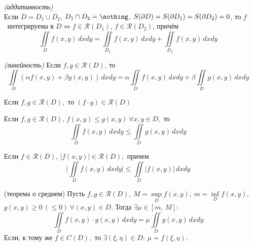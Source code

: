 \documentclass[a4paper,10pt]{article}
\begin{document}
	\begin{props*}
		\item \textit{(аддитивность)}\\
		Если $\overline{D} = \overline{D_1} \cup \overline{D_2}$, $D_1 \cap D_2 = \nothing$, $S(\partial D) = S(\partial D_1) = S(\partial D_2) = 0$, то $f$~интегрируема в $D \Leftrightarrow f \in \mathcal{R}(D_1)$, $f \in \mathcal{R}(D_2)$, причём $$\iint\limits_D f(x, y) \, dxdy = \iint\limits_{D_1} f(x, y) \, dxdy + \iint\limits_{D_2} f(x, y) \, dxdy$$
		\item \textit{(линейность)} Если $f, g \in\mathcal{R}(D)$, то\\
		$$\iint\limits_D(\alpha f(x,y)+\beta g(x,y))\,dxdy = \alpha\iint\limits_D f(x,y)\,dxdy + \beta\iint\limits_D g(x,y)\,dxdy$$
		\item Если $f,g\in \mathcal{R}(D),$ то $(f\cdot g)\in \mathcal{R}(D)$
		\item Если $f,g\in \mathcal{R}(D),\, f(x,y)\le g(x,y)~\forall x,y\in D,$ то $$\iint\limits_D f(x,y)\,dxdy \le \iint\limits_D g(x,y)\,dxdy$$
		\item Если $f\in \mathcal{R}(D),\, |f(x,y)|\in \mathcal{R}(D),$ причем $$\Big|\iint\limits_D f(x,y)\,dxdy\Big|\le \iint\limits_D |f(x,y)|\,dxdy$$
		\item (теорема о среднем) Пусть $f,g\in \mathcal{R}(D),~M=\sup\limits_D f(x,y),~m=\inf\limits_D f(x,y),$ $g(x,y)\ge 0\,(\le 0)~\forall (x,y)\in D.$ Тогда $\exists\mu\in [m,\,M]:$ $$\iint\limits_D f(x,y)\cdot g (x,y)\, dxdy = \mu \iint\limits_D g(x,y)\,dxdy$$
		Если, к тому же $f\in C(D),$ то $\exists(\xi,\eta)\in D:~\mu = f(\xi,\eta)$.
	\end{props*}
\end{document}
